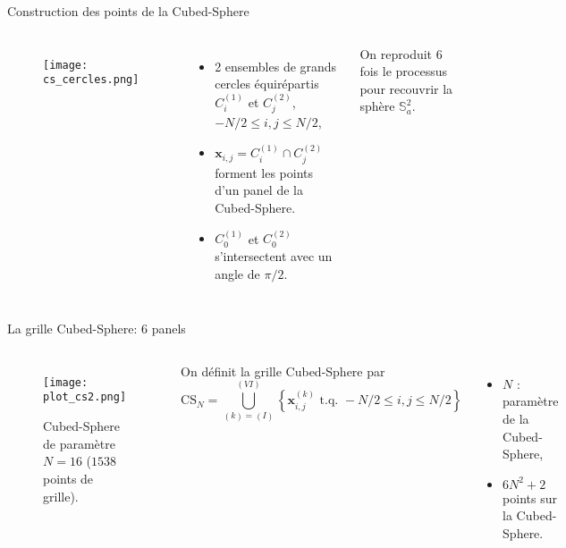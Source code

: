 \documentclass[11pt]{beamer}
\def\CS{\text{CS}}
\begin{document}
\begin{frame}{Construction des points de la Cubed-Sphere}
\begin{columns}
\begin{figure}[htbp]
\begin{center}
\texttt{[image: cs\_cercles.png]}
\end{center}
\end{figure}  
\begin{itemize}
\item 2 ensembles de grands cercles équirépartis $C_i^{(1)}$ et $C_j^{(2)}$, $-N/2 \leq i,j \leq N/2$,

\item $\mathbf{x}_{i,j}=C_i^{(1)} \cap C_j^{(2)}$ forment les points d'un panel de la Cubed-Sphere.

\item $C_0^{(1)}$ et $C_0^{(2)}$ s'intersectent avec un angle de $\pi/2$.
\end{itemize}

\begin{block}{}
On reproduit 6 fois le processus pour recouvrir la sphère $\mathbb{S}_a^2$.
\end{block}

\end{columns}
\end{frame}













\begin{frame}{La grille Cubed-Sphere: 6 panels}
\begin{columns}
\begin{figure}
\begin{center}
\texttt{[image: plot\_cs2.png]}
\caption{Cubed-Sphere de paramètre $N=16$ ($1538$ points de grille).}
\end{center}
\end{figure}
On définit la grille Cubed-Sphere par
$$
\CS_N = \bigcup_{(k)=(I)}^{(VI)} \left\lbrace \mathbf{x}_{i,j}^{(k)} \text{ t.q. } -N/2 \leq i,j \leq N/2 \right\rbrace
$$
\begin{itemize}
\item $N$ : paramètre de la Cubed-Sphere,
\vspace{.4cm}
\item $6N^2+2$ points sur la Cubed-Sphere.
\vspace{.7cm}
\end{itemize}
\end{columns}
\end{frame}
\end{document}
